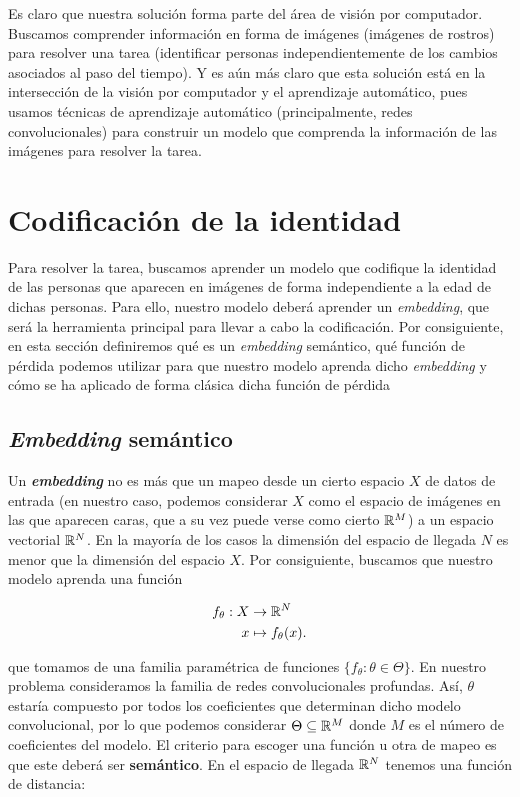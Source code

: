 Es claro que nuestra solución forma parte del área de visión por computador. Buscamos comprender información en forma de imágenes (imágenes de rostros) para resolver una tarea (identificar personas independientemente de los cambios asociados al paso del tiempo). Y es aún más claro que esta solución está en la intersección de la visión por computador y el aprendizaje automático, pues usamos técnicas de aprendizaje automático (principalmente, redes convolucionales) para construir un modelo que comprenda la información de las imágenes para resolver la tarea.

\section{Codificación de la identidad}

Para resolver la tarea, buscamos aprender un modelo que codifique la identidad de las personas que aparecen en imágenes de forma independiente a la edad de dichas personas. Para ello, nuestro modelo deberá aprender un \textit{embedding}, que será la herramienta principal para llevar a cabo la codificación. Por consiguiente, en esta sección definiremos qué es un \textit{embedding} semántico, qué función de pérdida podemos utilizar para que nuestro modelo aprenda dicho \textit{embedding} y cómo se ha aplicado de forma clásica dicha función de pérdida

\subsection{\textit{Embedding} semántico} \label{isec:embeddings}

Un \textbf{\textit{embedding}} no es más que un mapeo desde un cierto espacio $X$ de datos de entrada (en nuestro caso, podemos considerar $X$ como el espacio de imágenes en las que aparecen caras, que a su vez puede verse como cierto $\mathbb{R}^M$) a un espacio vectorial $\mathbb{R}^N$. En la mayoría de los casos la dimensión del espacio de llegada $N$ es menor que la dimensión del espacio $X$. Por consiguiente, buscamos que nuestro modelo aprenda una función

\begin{equation}
\begin{split}
    f_{\theta}: X & \to \mathbb{R}^N \\
    x & \mapsto f_{\theta}(x).
\end{split}
\end{equation}

que tomamos de una familia paramétrica de funciones $\{f_{\theta}: \theta \in \Theta \}$. En nuestro problema consideramos la familia de redes convolucionales profundas. Así, $\theta$ estaría compuesto por todos los coeficientes que determinan dicho modelo convolucional, por lo que podemos considerar $\Theta \subseteq \mathbb{R}^M$ donde $M$ es el número de coeficientes del modelo. El criterio para escoger una función u otra de mapeo es que este deberá ser \textbf{semántico}. En el espacio de llegada $\mathbb{R}^N$ tenemos una función de distancia:

